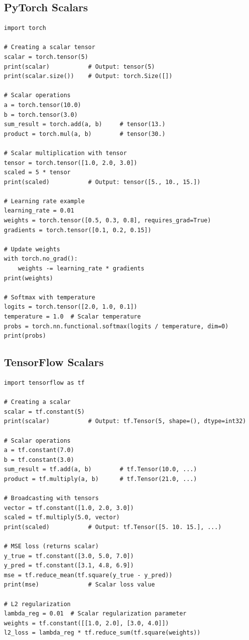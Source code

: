 \documentclass[11pt,a4paper]{article}
\begin{document}
\subsection{PyTorch Scalars}

\begin{lstlisting}
import torch

# Creating a scalar tensor
scalar = torch.tensor(5)
print(scalar)           # Output: tensor(5)
print(scalar.size())    # Output: torch.Size([])

# Scalar operations
a = torch.tensor(10.0)
b = torch.tensor(3.0)
sum_result = torch.add(a, b)     # tensor(13.)
product = torch.mul(a, b)        # tensor(30.)

# Scalar multiplication with tensor
tensor = torch.tensor([1.0, 2.0, 3.0])
scaled = 5 * tensor
print(scaled)           # Output: tensor([5., 10., 15.])

# Learning rate example
learning_rate = 0.01
weights = torch.tensor([0.5, 0.3, 0.8], requires_grad=True)
gradients = torch.tensor([0.1, 0.2, 0.15])

# Update weights
with torch.no_grad():
    weights -= learning_rate * gradients
print(weights)

# Softmax with temperature
logits = torch.tensor([2.0, 1.0, 0.1])
temperature = 1.0  # Scalar temperature
probs = torch.nn.functional.softmax(logits / temperature, dim=0)
print(probs)
\end{lstlisting}

\subsection{TensorFlow Scalars}

\begin{lstlisting}
import tensorflow as tf

# Creating a scalar
scalar = tf.constant(5)
print(scalar)           # Output: tf.Tensor(5, shape=(), dtype=int32)

# Scalar operations
a = tf.constant(7.0)
b = tf.constant(3.0)
sum_result = tf.add(a, b)        # tf.Tensor(10.0, ...)
product = tf.multiply(a, b)      # tf.Tensor(21.0, ...)

# Broadcasting with tensors
vector = tf.constant([1.0, 2.0, 3.0])
scaled = tf.multiply(5.0, vector)
print(scaled)           # Output: tf.Tensor([5. 10. 15.], ...)

# MSE loss (returns scalar)
y_true = tf.constant([3.0, 5.0, 7.0])
y_pred = tf.constant([3.1, 4.8, 6.9])
mse = tf.reduce_mean(tf.square(y_true - y_pred))
print(mse)              # Scalar loss value

# L2 regularization
lambda_reg = 0.01  # Scalar regularization parameter
weights = tf.constant([[1.0, 2.0], [3.0, 4.0]])
l2_loss = lambda_reg * tf.reduce_sum(tf.square(weights))
\end{lstlisting}
\end{document}
